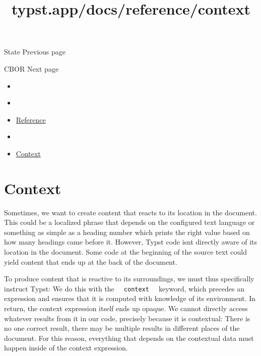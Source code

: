 \href{/docs/reference/introspection/state/}{\pandocbounded{}}

{ State } { Previous page }

\href{/docs/reference/data-loading/cbor/}{\pandocbounded{}}

{ CBOR } { Next page }


\title{typst.app/docs/reference/context}

\begin{itemize}
\tightlist
\item
  \href{/docs}{}
\item
  
\item
  \href{/docs/reference/}{Reference}
\item
  
\item
  \href{/docs/reference/context/}{Context}
\end{itemize}

\section{Context}\label{context}

Sometimes, we want to create content that reacts to its location in the
document. This could be a localized phrase that depends on the
configured text language or something as simple as a heading number
which prints the right value based on how many headings came before it.
However, Typst code isn\textquotesingle t directly aware of its location
in the document. Some code at the beginning of the source text could
yield content that ends up at the back of the document.

To produce content that is reactive to its surroundings, we must thus
specifically instruct Typst: We do this with the
\texttt{\ }{\texttt{\ context\ }}\texttt{\ } keyword, which precedes an
expression and ensures that it is computed with knowledge of its
environment. In return, the context expression itself ends up opaque. We
cannot directly access whatever results from it in our code, precisely
because it is contextual: There is no one correct result, there may be
multiple results in different places of the document. For this reason,
everything that depends on the contextual data must happen inside of the
context expression.

